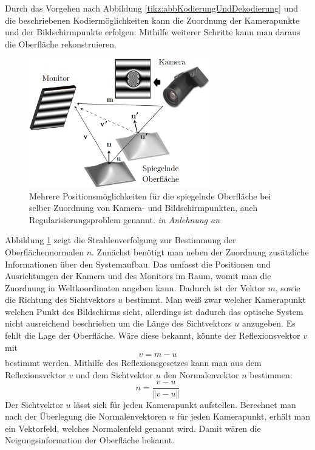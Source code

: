 Durch das Vorgehen nach Abbildung \ref{tikz:abbKodierungUndDekodierung} und die beschriebenen Kodiermöglichkeiten kann die Zuordnung der Kamerapunkte und der Bildschirmpunkte erfolgen.
Mithilfe weiterer Schritte kann man daraus die Oberfläche rekonstruieren.
%
\begin{figure}[H]
	\centering
	\includegraphics[width=0.7\textwidth]{02_grundlagenZurDeflektometrie/rekonstruktion/rekonstruktionUndRegularisierungsproblem/figures/regularisierungsproblem}
	\caption[Regularisierungsproblem]{Mehrere Positionsmöglichkeiten für die spiegelnde Oberfläche bei selber Zuordnung von Kamera- und Bildschirmpunkten, auch Regularisierungsproblem genannt. \textit{in Anlehnung an} \cite{stereoDeflektometrie}}
	\label{img:regularisierungsproblem}
\end{figure}
%
\noindent
Abbildung \ref{img:regularisierungsproblem} zeigt die Strahlenverfolgung zur Bestimmung der Oberflächennormalen $n$.
Zunächst benötigt man neben der Zuordnung zusätzliche Informationen über den Systemaufbau.
Das umfasst die Positionen und Ausrichtungen der Kamera und des Monitors im Raum, womit man die Zuordnung in Weltkoordinaten angeben kann.
Dadurch ist der Vektor $m$, sowie die Richtung des Sichtvektors $u$ bestimmt.
Man weiß zwar welcher Kamerapunkt welchen Punkt des Bildschirms sieht, allerdings ist dadurch das optische System nicht ausreichend beschrieben um die Länge des Sichtvektors $u$ anzugeben.
Es fehlt die Lage der Oberfläche.
Wäre diese bekannt, könnte der Reflexionsvektor $v$ mit 
\begin{equation*}
	v = m - u
\end{equation*}
bestimmt werden.
Mithilfe des Reflexionsgesetzes kann man aus dem Reflexionsvektor $v$ und dem Sichtvektor $u$ den Normalenvektor $n$ bestimmen:
%
\begin{equation}
	n = \dfrac{v - u}{\left\Vert v - u \right\Vert}
\end{equation}
%
Der Sichtvektor $u$ lässt sich für jeden Kamerapunkt aufstellen.
Berechnet man nach der Überlegung die Normalenvektoren $n$ für jeden Kamerapunkt, erhält man ein Vektorfeld, welches Normalenfeld genannt wird.
Damit wären die Neigungsinformation der Oberfläche bekannt.

